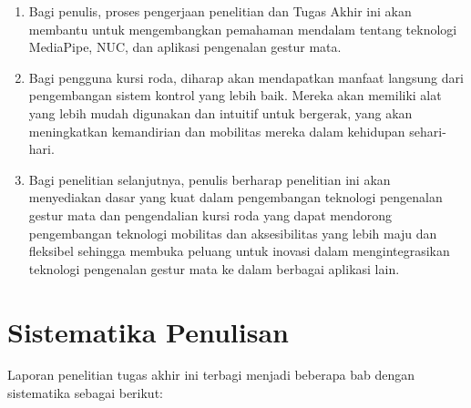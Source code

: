 \begin{enumerate}[nolistsep]

  \item Bagi penulis, proses pengerjaan penelitian dan Tugas Akhir ini akan membantu untuk mengembangkan pemahaman mendalam tentang teknologi MediaPipe, NUC, dan aplikasi pengenalan gestur mata.
  \item Bagi pengguna kursi roda, diharap akan mendapatkan manfaat langsung dari pengembangan sistem kontrol yang lebih baik. Mereka akan memiliki alat yang lebih mudah digunakan dan intuitif untuk bergerak, yang akan meningkatkan kemandirian dan mobilitas mereka dalam kehidupan sehari-hari.
  \item Bagi penelitian selanjutnya, penulis berharap penelitian ini akan menyediakan dasar yang kuat dalam pengembangan teknologi pengenalan gestur mata dan pengendalian kursi roda yang dapat mendorong pengembangan teknologi mobilitas dan aksesibilitas yang lebih maju dan fleksibel sehingga membuka peluang untuk inovasi dalam mengintegrasikan teknologi pengenalan gestur mata ke dalam berbagai aplikasi lain.

\end{enumerate}

\section{Sistematika Penulisan}
\label{sec:sistematikapenulisan}

Laporan penelitian tugas akhir ini terbagi menjadi beberapa bab dengan sistematika sebagai berikut:

